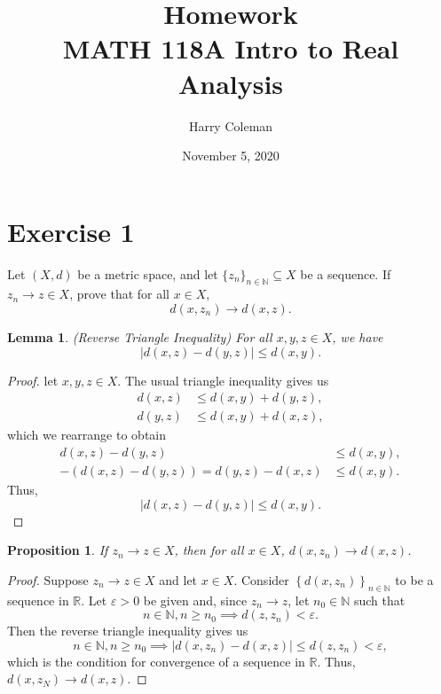 \documentclass[12pt]{article}
\newtheorem{lemma}{Lemma}
\newtheorem{proposition}{Proposition}
\newenvironment{problem}
    {\begin{lrbox}{\mybox}\begin{minipage}{\textwidth-10pt}}
    {\end{minipage}\end{lrbox}\framebox[6.5in]{\usebox{\mybox}}}
\newcommand{\seq}[2][n]{\left\{#2\right\}_{#1\in\N}}
\newcommand{\<}{\left\langle}
\renewcommand{\>}{\right\rangle}
\newcommand{\N}{\mathbb{N}}
\newcommand{\R}{\mathbb{R}}
\let\eps\varepsilon
\begin{document}
 
\title{Homework\\
    \large MATH 118A Intro to Real Analysis
}
\author{Harry Coleman}
\date{November 5, 2020}
\maketitle

\section*{Exercise 1}
\begin{problem}
    Let $(X,d)$ be a metric space, and let $\{z_n\}_{n \in\mathbb{N}}\subseteq X$ be a sequence. If $z_n \to z\in X$, prove that for all $x \in X$, 
    \begin{equation*}
        d(x,z_n) \to d(x,z).
    \end{equation*}
\end{problem}

\begin{lemma}
    (Reverse Triangle Inequality) For all $x,y,z\in X$, we have
    \[|d(x,z) - d(y,z)| \leq d(x,y).\]
\end{lemma}

\begin{proof}
    let $x,y,z\in X$. The usual triangle inequality gives us
    \begin{align*}
        d(x,z) &\leq d(x,y) + d(y,z), \\
        d(y,z) &\leq d(x,y) + d(x,z),
    \end{align*}
    which we rearrange to obtain
    \begin{align*}
        d(x,z) - d(y,z) &\leq d(x,y), \\
        -(d(x,z) - d(y,z)) = d(y,z) - d(x,z) &\leq d(x,y).
    \end{align*}
    Thus,
    \[|d(x,z) - d(y,z)| \leq d(x,y).\]

\end{proof}

\begin{proposition}
    If $z_n \to z\in X$, then for all $x \in X$, $d(x,z_n) \to d(x,z)$.
\end{proposition}

\begin{proof}
    Suppose $z_n\to z\in X$ and let $x\in X$. Consider $\seq{d(x,z_n)}$ to be a sequence in $\R$. Let $\eps>0$ be given and, since $z_n\to z$, let $n_0\in\N$ such that
    \[n\in\N, n\geq n_0 \implies d(z,z_n) < \eps.\]
    Then the reverse triangle inequality gives us
    \[n\in\N, n\geq n_0 \implies |d(x,z_n) - d(x,z)| \leq d(z, z_n) < \eps,\]
    which is the condition for convergence of a sequence in $\R$. Thus, $d(x,z_N)\to d(x,z)$.

\end{proof}
\end{document}
